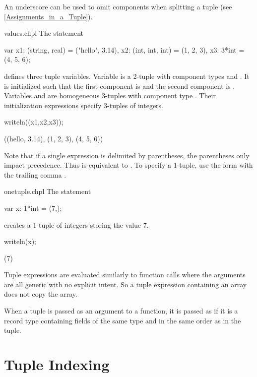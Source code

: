 An underscore can be used to omit components when splitting
a tuple (see \ref{Assignments_in_a_Tuple}).

\begin{chapelexample}{values.chpl}
The statement
\begin{chapel}
var x1: (string, real) = ("hello", 3.14),
    x2: (int, int, int) = (1, 2, 3),
    x3: 3*int = (4, 5, 6);
\end{chapel}
defines three tuple variables.  Variable  is a 2-tuple with
component types  and .  It is initialized such
that the first component is  and the second
component is .  Variables  and  are
homogeneous 3-tuples with component type .  Their
initialization expressions specify 3-tuples of integers.
\begin{chapelpost}
writeln((x1,x2,x3));
\end{chapelpost}
\begin{chapeloutput}
((hello, 3.14), (1, 2, 3), (4, 5, 6))
\end{chapeloutput}
\end{chapelexample}

Note that if a single expression is delimited by parentheses, the
parentheses only impact precedence.  Thus  is equivalent
to .  To specify a 1-tuple, use the form with the trailing
comma .

\begin{chapelexample}{onetuple.chpl}
The statement
\begin{chapel}
var x: 1*int = (7,);
\end{chapel}
creates a 1-tuple of integers storing the value 7.
\begin{chapelpost}
writeln(x);
\end{chapelpost}
\begin{chapeloutput}
(7)
\end{chapeloutput}
\end{chapelexample}

Tuple expressions are evaluated similarly to function calls where the
arguments are all generic with no explicit intent.  So a tuple
expression containing an array does not copy the array.  

When a tuple is passed as an argument to a function, it is passed as
if it is a record type containing fields of the same type and in
the same order as in the tuple.

\section{Tuple Indexing}
\label{Tuple_Indexing}


